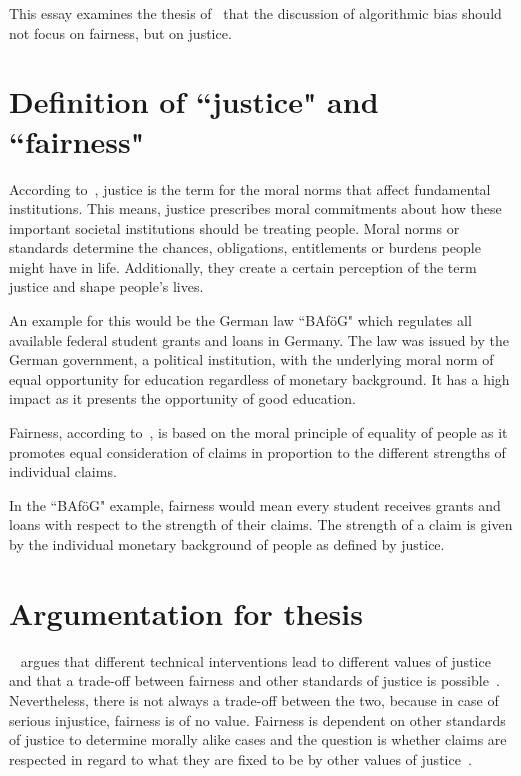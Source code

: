 
This essay examines the thesis of~\cite{vredenburgh} that the discussion of algorithmic bias should not focus on fairness, but on justice.

\section*{Definition of ``justice" and ``fairness" }

According to~\cite[][3, 11--12]{vredenburgh}, justice is the term for the moral norms that affect fundamental institutions.
This means, justice prescribes moral commitments about how these important societal institutions should be treating people.
Moral norms or standards determine the chances, obligations, entitlements or burdens people might have in life.
Additionally, they create a certain perception of the term justice and shape people's lives.

An example for this would be the German law ``BAföG" which regulates all available federal student grants and loans in Germany.
The law was issued by the German government, a political institution, with the underlying moral norm of equal opportunity for education regardless of monetary background.
It has a high impact as it presents the opportunity of good education.

Fairness, according to~\cite[][3, 13]{vredenburgh}, is based on the moral principle of equality of people as it promotes equal consideration of claims in proportion to the different strengths of individual claims.

In the ``BAföG" example, fairness would mean every student receives grants and loans with respect to the strength of their claims.
The strength of a claim is given by the individual monetary background of people as defined by justice.

\section*{Argumentation for thesis}

~\cite{vredenburgh} argues that different technical interventions lead to different values of justice and that a trade-off between fairness and other standards of justice is possible~\parencite[][18]{vredenburgh}.
Nevertheless, there is not always a trade-off between the two, because in case of serious injustice, fairness is of no value.
Fairness is dependent on other standards of justice to determine morally alike cases and the question is whether claims are respected in regard to what they are fixed to be by other values of justice~\parencite[][18, 19]{vredenburgh}.

